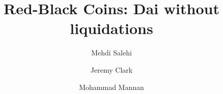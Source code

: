 \documentclass[envcountsect]{llncs}
\begin{document}
\frontmatter
\mainmatter

\title{\Large \bf Red-Black Coins: Dai without liquidations}

\author{Mehdi Salehi \and Jeremy Clark \and Mohammad Mannan}

\maketitle







%
%






\clearpage
\appendix

%

\end{document}

